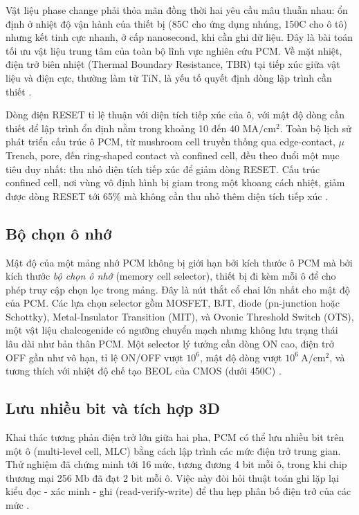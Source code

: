 \documentclass[12pt,a4paper]{article}
\begin{document}
Vật liệu phase change phải thỏa mãn đồng thời hai yêu cầu mâu thuẫn nhau: ổn định ở nhiệt độ vận hành của thiết bị (85\textdegree{}C cho ứng dụng nhúng, 150\textdegree{}C cho ô tô) nhưng kết tinh cực nhanh, ở cấp nanosecond, khi cần ghi dữ liệu. Đây là bài toán tối ưu vật liệu trung tâm của toàn bộ lĩnh vực nghiên cứu PCM. Về mặt nhiệt, điện trở biên nhiệt (Thermal Boundary Resistance, TBR) tại tiếp xúc giữa vật liệu và điện cực, thường làm từ TiN, là yếu tố quyết định dòng lập trình cần thiết \cite{wong2010}.

Dòng điện RESET tỉ lệ thuận với diện tích tiếp xúc của ô, với mật độ dòng cần thiết để lập trình ổn định nằm trong khoảng 10 đến 40 $\mathrm{MA/cm^2}$. Toàn bộ lịch sử phát triển cấu trúc ô PCM, từ mushroom cell truyền thống qua edge-contact, $\mu$Trench, pore, đến ring-shaped contact và confined cell, đều theo đuổi một mục tiêu duy nhất: thu nhỏ diện tích tiếp xúc để giảm dòng RESET. Cấu trúc confined cell, nơi vùng vô định hình bị giam trong một khoang cách nhiệt, giảm được dòng RESET tới 65\% mà không cần thu nhỏ thêm diện tích tiếp xúc \cite{wong2010}.

\subsection{Bộ chọn ô nhớ}

Mật độ của một mảng nhớ PCM không bị giới hạn bởi kích thước ô PCM mà bởi kích thước \textit{bộ chọn ô nhớ} (memory cell selector), thiết bị đi kèm mỗi ô để cho phép truy cập chọn lọc trong mảng. Đây là nút thắt cổ chai lớn nhất cho mật độ của PCM. Các lựa chọn selector gồm MOSFET, BJT, diode (pn-junction hoặc Schottky), Metal-Insulator Transition (MIT), và Ovonic Threshold Switch (OTS), một vật liệu chalcogenide có ngưỡng chuyển mạch nhưng không lưu trạng thái lâu dài như bản thân PCM. Một selector lý tưởng cần dòng ON cao, điện trở OFF gần như vô hạn, tỉ lệ ON/OFF vượt $10^6$, mật độ dòng vượt $10^6\ \mathrm{A/cm^2}$, và tương thích với nhiệt độ chế tạo BEOL của CMOS (dưới 450\textdegree{}C) \cite{wong2010}.

\subsection{Lưu nhiều bit và tích hợp 3D}

Khai thác tương phản điện trở lớn giữa hai pha, PCM có thể lưu nhiều bit trên một ô (multi-level cell, MLC) bằng cách lập trình các mức điện trở trung gian. Thử nghiệm đã chứng minh tới 16 mức, tương đương 4 bit mỗi ô, trong khi chip thương mại 256 Mb đã đạt 2 bit mỗi ô. Việc này đòi hỏi thuật toán ghi lặp lại kiểu đọc - xác minh - ghi (read-verify-write) để thu hẹp phân bố điện trở của các mức \cite{wong2010}.
\end{document}
